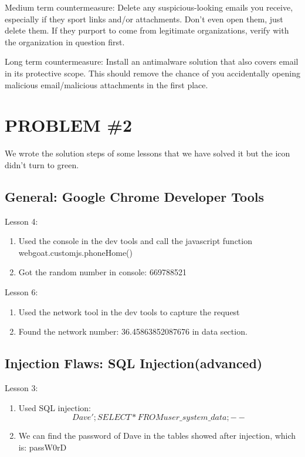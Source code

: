 \documentclass[conference]{IEEEtran}
\begin{document}
Medium term countermeasure:
Delete any suspicious-looking emails you receive, especially if they sport links and/or attachments. Don’t even open them, just delete them. If they purport to come from legitimate organizations, verify with the organization in question first.
 
Long term countermeasure:
Install an antimalware solution that also covers email in its protective scope. This should remove the chance of you accidentally opening malicious email/malicious attachments in the first place.

\section{PROBLEM \#2}
We wrote the solution steps of some lessons that we have solved it but the icon didn't turn to green.
\subsection{General: Google Chrome Developer Tools}

Lesson 4:
\begin{enumerate}
\item  Used the console in the dev tools and call the javascript function webgoat.customjs.phoneHome()
\item Got the random number in console: 669788521
\end{enumerate}

Lesson 6:
\begin{enumerate}
\item  Used the network tool in the dev tools to capture the request
\item Found the network number: 36.45863852087676 in data section.
\end{enumerate}

\subsection{Injection Flaws: SQL Injection(advanced)}
Lesson 3:
\begin{enumerate}
\item  Used SQL injection: 
\begin{equation}
Dave'; SELECT * FROM user\_system\_data;--
\end{equation}
\item We can find the password of Dave in the tables showed after injection, which is: passW0rD
\end{enumerate}
\end{document}
